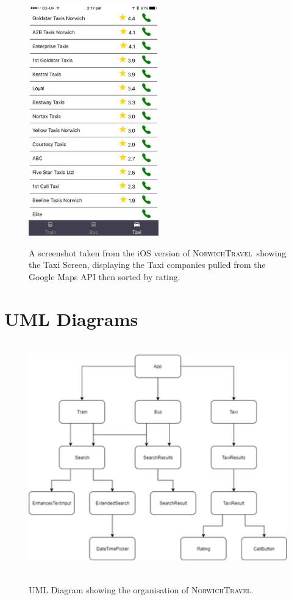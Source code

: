\documentclass[cmpstyle]{ueacmpstyle}
\newcommand{\nt}{\textsc{NorwichTravel}}
\begin{document}
		\begin{figure}[h]
			\centering
			\includegraphics[height=10cm]{images/ios-taxi.jpg}\\
			\caption{A screenshot taken from the iOS version of \nt \ showing the Taxi Screen, displaying the Taxi companies pulled from the Google Maps API then sorted by rating.}\label{fig:ios-taxi}
		\end{figure}
	\clearpage
	\section{UML Diagrams}
		\begin{figure}[h]
			\centering
			\includegraphics[height=10cm]{images/object-orientated.png}\\
			\caption{UML Diagram showing the organisation of \nt.}\label{fig:oo}
		\end{figure}
\end{document}
